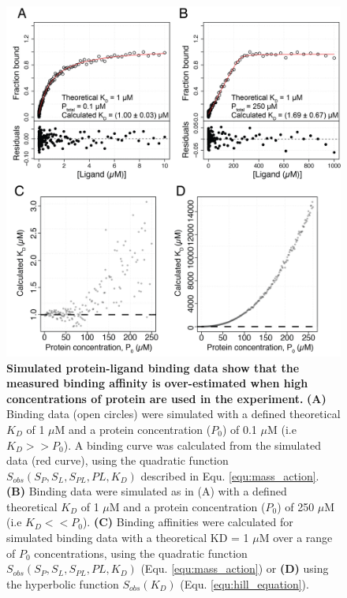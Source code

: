 \begin{figure}[!ht]
\includegraphics[scale=0.7]{ch4_fig2_binding_simulation.png}
\caption[Simulated protein-ligand binding data show that the measured binding affinity is over-estimated when high concentrations of protein are used in the experiment.] {\textbf{Simulated protein-ligand binding data show that the measured binding affinity is over-estimated when high concentrations of protein are used in the experiment.} \textbf{(A)} Binding data (open circles) were simulated with a defined theoretical $K_{D}$ of 1 $\mu$M and a protein concentration ($P_0$) of 0.1 $\mu$M (i.e $K_{D} >> P_{0}$). A binding curve was calculated from the simulated data (red curve), using the quadratic function $S_{obs}(S_{P}, S_{L}, S_{PL}, PL, K_{D})$ described in Equ. \ref{equ:mass_action}. \textbf{(B)} Binding data were simulated as in (A) with a defined theoretical $K_{D}$ of 1 $\mu$M and a protein concentration ($P_0$) of 250 $\mu$M (i.e $K_{D} << P_{0}$). \textbf{(C)} Binding affinities were calculated for simulated binding data with a theoretical KD = 1 $\mu$M over a range of $P_0$ concentrations, using the quadratic function $S_{obs}(S_{P}, S_{L}, S_{PL}, PL, K_{D})$ (Equ. \ref{equ:mass_action}) or \textbf{(D)} using the hyperbolic function $S_{obs}(K_{D})$ (Equ. \ref{equ:hill_equation}).}
\label{fig:binding_simulation}
\end{figure}
%
%
\clearpage



